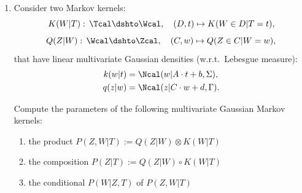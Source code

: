 \begin{enumerate}[label=3.\arabic*]
\begin{ungradedsolution}
\begin{enumerate}
\begin{align*}
                 & = \delta_{f_2}(A|T=t)                                                                              \\
                 & = \delta_{f_2}(X|T)(A, t),
            \end{align*}
            so $f_m = f_2$.
            \item Let $\delta_{f_{cd}}(Y|X, T): \Xcal\times \Tcal \dshto \Ycal$ be the conditional Markov kernel such that
            \begin{equation}\label{foo}
                \delta_{f_p}(X, Y|T) = \delta_{f_{cd}}(Y|X, T) \otimes \delta_{f_m}(X|T).
            \end{equation}
            Then, for all $A\in \Bcal_\Xcal$, $B\in\Bcal_\Ycal$ and $t\in\Tcal$ we have
            \begin{align*}
                [\delta_{f_3}(Y|T)\otimes \delta_{f_2}(X|T)](B\times A, t)
                 & = [\delta_{f_2}(X|T)\otimes \delta_{f_3}(Y|T)](A\times B, t)        & \text{Fubini}             \\
                 & = \delta_{f_p}(X, Y|T)(A\times B, t)                                & \text{(b)}                \\
                 & = [\delta_{f_{cd}}(Y|X, T) \otimes \delta_{f_m}(X|T)](B\times A, t) & \text{eqn.\ (\ref*{foo})} \\
                 & = [\delta_{f_{cd}}(Y|X, T) \otimes \delta_{f_2}(X|T)](B\times A, t) & \text{(c)}
            \end{align*}
            and so for $f_{cd} = f_3$, by Lemma \ref*{ess-unique} we have that $\delta_{f_{cd}} = \delta_{f_3}$ up to $\delta_{f_m}(X|T)$-null sets.

        \end{enumerate}
    \end{ungradedsolution}

    \item %
    Consider two Markov kernels:
    \[K(W|T):\, \Tcal \dshto \Wcal,\quad (D,t) \mapsto K(W \in D|T=t),  \]
    \[Q(Z|W):\, \Wcal \dshto \Zcal,\quad (C,w) \mapsto Q(Z \in C|W=w),  \]
    that have linear multivariate Gaussian densities (w.r.t.\ Lebesgue measure):
    \begin{align*}
        k(w|t) & = \Ncal(w|A \cdot t +b, \Sigma),   \\
        q(z|w) & = \Ncal(z| C \cdot w + d, \Gamma).
    \end{align*}

    Compute the parameters of the following multivariate Gaussian Markov kernels:
    \begin{enumerate}
        \item the product $P(Z, W|T):=Q(Z|W) \otimes K(W|T)$
        \item the composition $P(Z|T):=Q(Z|W) \circ K(W|T)$
        \item the conditional $P(W|Z, T)$ of $P(Z, W|T)$
    \end{enumerate}


\end{enumerate}
